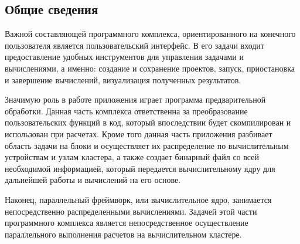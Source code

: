 \documentclass[a4paper, 14pt]{extarticle}
\theoremstyle{definition}
\begin{document}
\subsection{Общие сведения}

\par Важной составляющей программного комплекса, ориентированного на конечного пользователя является пользовательский интерфейс. В его задачи входит предоставление удобных инструментов для управления задачами и вычислениями, а именно: создание и сохранение проектов, запуск, приостановка и завершение вычислений, визуализация полученных результатов.

\par Значимую роль в работе приложения играет программа предварительной обработки. Данная часть комплекса ответственна за преобразование пользовательских функций в код, который впоследствии будет скомпилирован и использован при расчетах. Кроме того данная часть приложения разбивает область задачи на блоки и осуществляет их распределение по вычислительным устройствам и узлам кластера, а также создает бинарный файл со всей необходимой информацией, который передается вычислительному ядру для дальнейшей работы и вычислений на его основе.

\par Наконец, параллельный фреймворк, или вычислительное ядро, занимается непосредственно распределенными вычислениями. Задачей этой части программного комплекса является непосредственное осуществление параллельного выполнения расчетов на вычислительном кластере.



\end{document}
